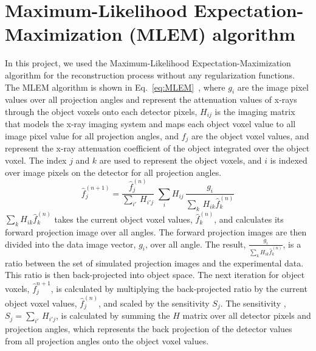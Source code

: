 \section{Maximum-Likelihood Expectation-Maximization (MLEM) algorithm }
In this project, we used the Maximum-Likelihood Expectation-Maximization algorithm for the reconstruction process without any regularization functions.  The MLEM algorithm is shown in Eq.~\ref{eq:MLEM}~\citep{EmissionTom2004}, where $g_i$ are the image pixel values over all projection angles and represent the attenuation values of x-rays through the object voxels onto each detector pixels, $H_{ij}$ is the imaging matrix that models the x-ray imaging system and maps each object voxel value to all image pixel value for all projection angles, and $f_{j}$ are the object voxel values, and represent the x-ray attenuation coefficient of the object integrated over the object voxel.  The index $j$ and $k$ are used to represent the object voxels, and $i$ is indexed over image pixels on the detector for all projection angles.
%
\begin{equation}
\hat{f}^{(n+1)}_{j} = \frac{\hat{f}^{(n)}_j}{{\sum\limits_{i'}} \, H_{i'j}} \; 
						\sum\limits_{i} H_{ij} \, \frac{g_{i}}{\sum\limits_{k} \, H_{ik} \hat{f}_{k}^{(n)}}
\label{eq:MLEM}
\end{equation}
%
$\sum\limits_k H_{ik} \hat{f}_k^{(n)}$ takes the current object voxel values, $\hat{f}^{(n)}_k$, and calculates its forward projection image over all angles.  The forward projection images are then divided into the data image vector, $g_i$, over all angle.  The result, $\frac{g_i}{\sum\limits_k H_{ik} \hat{f}_k^{(n)}}$, is a ratio between the set of simulated projection images and the experimental data.  This ratio is then back-projected into object space.  The next iteration for object voxels, $\hat{f}_j^{n+1}$, is calculated by multiplying the back-projected ratio by the current object voxel values, $\hat{f}_j^{(n)}$, and scaled by the sensitivity $S_j$.  The sensitivity , $S_j = \sum\limits_{i'} \, H_{i' j}$, is calculated by summing the $H$ matrix over all detector pixels and projection angles, which represents the back projection of the detector values from all projection angles onto the object voxel values.

